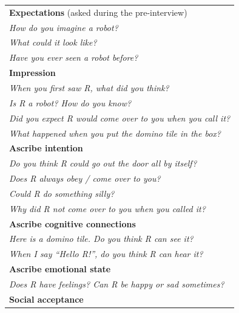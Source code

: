 \documentclass[letterpaper, 10pt, conference]{ieeeconf}
\begin{document}
\begin{table}[h!t]
\centering
\footnotesize
\begin{tabular}{p{1\linewidth}}
    \toprule
    \textbf{Expectations} (asked during the pre-interview) \\
    \emph{How do you imagine a robot?} \\
    \emph{What could it look like?} \\
    \emph{Have you ever seen a robot before?} \\

    \vspace{0.2em}
    \textbf{Impression} \\


    \emph{When you first saw R, what did you think?} \\
    \emph{Is R a robot? How do you know?} \\
    \emph{Did you expect R would come over to you when you call it?} \\
    \emph{What happened when you put the domino tile in the box?} \\

    \vspace{0.2em}
    \textbf{Ascribe intention} \\


    \emph{Do you think R could go out the door all by itself?} \\	
    \emph{Does R always obey / come over to you?} \\
    \emph{Could R do something silly?} \\
    \emph{Why did R not come over to you when you called it?} \\

    \vspace{0.2em}
    \textbf{Ascribe cognitive connections} \\


    \emph{Here is a domino tile. Do you think R can see it?} \\ 
    \emph{When I say \textit{``Hello R!''}, do you think R can hear it?} \\

    \vspace{0.2em}
    \textbf{Ascribe emotional state} \\


    \emph{Does R have feelings? Can R be happy or sad sometimes?} \\

    \vspace{0.2em}
    \textbf{Social acceptance} \\



\end{tabular}
\end{table}
\end{document}

